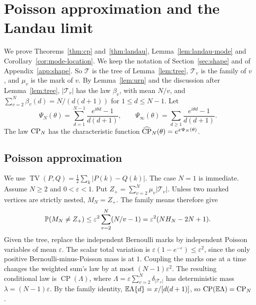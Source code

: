 \section{Poisson approximation and the Landau limit}\label{app:bulk}

We prove Theorems~\ref{thm:cp} and~\ref{thm:landau},
Lemma~\ref{lem:landau-mode} and Corollary~\ref{cor:mode-location}. We keep
the notation of Section~\ref{sec:shape} and of Appendix~\ref{app:shape}. So
$\mathcal T$ is the tree of Lemma~\ref{lem:tree}, $\mathcal T_v$ is the family
of $v$, and $\mu_v$ is the mark of $v$. By Lemma~\ref{lem:urn} and the
discussion after Lemma~\ref{lem:tree}, $\lvert\mathcal T_v\rvert$ has the law
$\beta_v$, with mean $N/v$, and $\sum_{v=2}^N\beta_v(d)=N/(d(d+1))$ for
$1\le d\le N-1$. Let
\[
 \Psi_N(\theta)=\sum_{d=1}^{N-1}\frac{e^{i\theta d}-1}{d(d+1)},\qquad
 \Psi_\infty(\theta)=\sum_{d\ge1}\frac{e^{i\theta d}-1}{d(d+1)} .
\]
The law $\mathrm{CP}_N$ has the characteristic function
$\widehat{\mathrm{CP}}_N(\theta)=e^{x\Psi_N(\theta)}$.

\subsection{Poisson approximation}\label{app:bulk-cp}

We use $\operatorname{TV}(P,Q)=\frac12\sum_k|P(k)-Q(k)|$.
The case $N=1$ is immediate. Assume $N\ge2$ and $0<\varepsilon<1$.
Put $Z_+=\sum_{v=2}^N\mu_v|\mathcal T_v|$. Unless two marked vertices
are strictly nested, $M_N=Z_+$. The family means therefore give
\[
 \mathbb{P}(M_N\ne Z_+)\le\varepsilon^2\sum_{v=2}^N(N/v-1)
 =\varepsilon^2(NH_N-2N+1).
\]
Given the tree, replace the independent Bernoulli marks by independent
Poisson variables of mean $\varepsilon$. The scalar total variation is
$\varepsilon(1-e^{-\varepsilon})\le\varepsilon^2$, since the only positive
Bernoulli-minus-Poisson mass is at $1$. Coupling the marks one at a time changes the weighted sum's law by at most $(N-1)\varepsilon^2$. The resulting conditional law is
$\operatorname{CP}(\Lambda)$, where
$\Lambda=\varepsilon\sum_{v=2}^N\delta_{|\mathcal T_v|}$ has deterministic
mass $\lambda=(N-1)\varepsilon$. By the family identity,
$\mathbb{E}\Lambda\{d\}=x/[d(d+1)]$, so $\operatorname{CP}(\mathbb{E}\Lambda)=\mathrm{CP}_N$.


